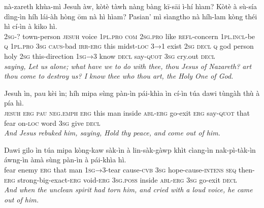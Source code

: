 \documentclass[11pt,a4paper]{article}
\begin{document}
\begin{exe}
\gll nà-zareth khùa-mì Jesuh àw, kòtè tàwh nàng bàng kī-sāi ì-hí hìam? Kòtè à sù-sía dìng-ìn híh lái-àh hòng ōm nà hì hìam? Pasian' mì sìangtho nà híh-lam kòng théi hì cí-ìn à kiko hì. \\
     \textsc{2sg}-? town-person \textsc{jesuh} voice \textsc{1pl}.\textsc{pro} \textsc{com} \textsc{2sg}.\textsc{pro} like \textsc{refl}-concern \textsc{1pl}.\textsc{incl}-be \textsc{q} \textsc{1pl}.\textsc{pro} \textsc{3sg} \textsc{caus}-bad \textsc{irr}-\textsc{erg} this midst-\textsc{loc} \textsc{3→1} exist \textsc{2sg} \textsc{decl} \textsc{q} god person holy \textsc{2sg} this-direction \textsc{1sg→3} know \textsc{decl} say-\textsc{quot} \textsc{3sg} cry.out \textsc{decl} \\
\glt \textcolor{kjvcolor}{\textit{saying, Let us alone; what have we to do with thee, thou Jesus of Nazareth? art thou come to destroy us? I know thee who thou art, the Holy One of God.}}

\gll Jesuh ìn, pau kèi ìn; híh mipa sùng pàn-ìn pái-khìa ìn cí-ìn túa dawi tùngàh thù à pía hì. \\
     \textsc{jesuh} \textsc{erg} \textsc{pau} \textsc{neg}.\textsc{emph} \textsc{erg} this man inside \textsc{abl}-\textsc{erg} go-exit \textsc{erg} say-\textsc{quot} that fear on-\textsc{loc} word \textsc{3sg} give \textsc{decl} \\
\glt \textcolor{kjvcolor}{\textit{And Jesus rebuked him, saying, Hold thy peace, and come out of him.}}

\gll Dawi gilo ìn túa mipa kòng-kaw sàk-ìn à lin-sàk-gàwp khìt cìang-ìn nak-pì-tàk-ìn áwng-ìn àmà sùng pàn-ìn à pái-khìa hì. \\
     fear enemy \textsc{erg} that man \textsc{1sg→3}-tear cause-\textsc{cvb} \textsc{3sg} hope-cause-\textsc{intens} \textsc{seq} then-\textsc{erg} strong-big-exact-\textsc{erg} void-\textsc{erg} \textsc{3sg}.\textsc{poss} inside \textsc{abl}-\textsc{erg} \textsc{3sg} go-exit \textsc{decl} \\
\glt \textcolor{kjvcolor}{\textit{And when the unclean spirit had torn him, and cried with a loud voice, he came out of him.}}


\end{exe}
\end{document}
